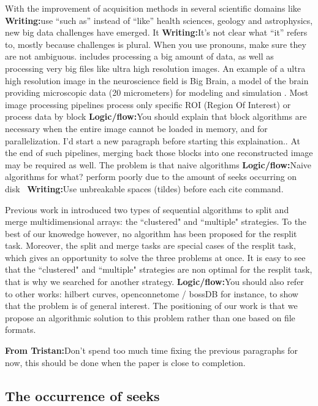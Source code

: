 \documentclass[conference]{IEEEtran}
\newcommand{\logic}[1]{\color{red}\textbf{Logic/flow:}#1\color{black}}
\newcommand{\writing}[1]{\color{green}\textbf{Writing:}#1\color{black}}
\newcommand{\tristan}[1]{\color{orange}\textbf{From Tristan:}#1\color{black}}
\begin{document}
With the improvement of acquisition methods in several scientific domains
like \writing{use ``such as'' instead of ``like''} health sciences, geology and astrophysics, new big data challenges
have emerged. It \writing{It's not clear what ``it'' refers to, mostly because challenges is plural.
 When you use pronouns, make sure they are not ambiguous.} includes processing a big amount of data, as well as
processing very big files like ultra high resolution images. An example of
a ultra high resolution image in the neuroscience field is Big Brain, a
model of the brain providing microscopic data (20 micrometers) for modeling
and simulation \cite{Amunts1472}. Most image processing pipelines process
only specific ROI (Region Of Interest) or process data by block \logic{You should explain that block algorithms 
are necessary when the entire image cannot be loaded in memory, and for parallelization. I'd start a new paragraph before 
starting this explaination.}. At the end
of such pipelines, merging back those blocks into one reconstructed image
may be required as well. The problem is that naive algorithms \logic{Naive algorithms for what?} perform
poorly due to the amount of seeks occurring on disk~\cite{seqalgorithms} \writing{Use unbreakable spaces (tildes) before each cite 
command}.

Previous work in \cite{seqalgorithms} introduced two
types of sequential
algorithms to split and merge multidimensional arrays: the ``clustered" and
``multiple" strategies. To the best of our knowedge however, no algorithm
has been proposed for the resplit task. Moreover, the split and merge tasks
are special cases of the resplit task, which gives an opportunity to solve
the three problems at once. It is easy to see that the ``clustered" and
``multiple" strategies are non optimal for the resplit task, that is why we
searched for another strategy. \logic{You should also refer to 
other works: hilbert curves, openconnetome / bossDB for instance, to show that the problem is of general interest.
The positioning of our work is that we propose an algorithmic solution to this problem rather than one based on file formats.}

\tristan{Don't spend too much time fixing the previous paragraphs for now, 
this should be done when the paper is close to completion.}

\subsection{The occurrence of seeks}
\end{document}
